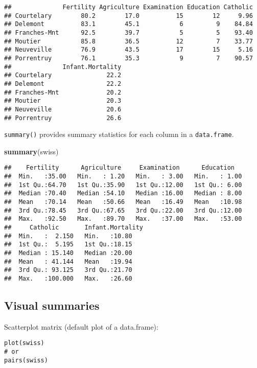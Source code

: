\documentclass[]{book}
\newenvironment{Shaded}{\begin{snugshade}}{\end{snugshade}}
\newcommand{\KeywordTok}[1]{\textcolor[rgb]{0.13,0.29,0.53}{\textbf{{#1}}}}
\newcommand{\NormalTok}[1]{{#1}}
\begin{document}
\begin{verbatim}
##              Fertility Agriculture Examination Education Catholic
## Courtelary        80.2        17.0          15        12     9.96
## Delemont          83.1        45.1           6         9    84.84
## Franches-Mnt      92.5        39.7           5         5    93.40
## Moutier           85.8        36.5          12         7    33.77
## Neuveville        76.9        43.5          17        15     5.16
## Porrentruy        76.1        35.3           9         7    90.57
##              Infant.Mortality
## Courtelary               22.2
## Delemont                 22.2
## Franches-Mnt             20.2
## Moutier                  20.3
## Neuveville               20.6
## Porrentruy               26.6
\end{verbatim}

\texttt{summary()} provides summary statistics for each column in a
\texttt{data.frame}.

\begin{Shaded}
\begin{Highlighting}[]
\KeywordTok{summary}\NormalTok{(swiss)}
\end{Highlighting}
\end{Shaded}

\begin{verbatim}
##    Fertility      Agriculture     Examination      Education    
##  Min.   :35.00   Min.   : 1.20   Min.   : 3.00   Min.   : 1.00  
##  1st Qu.:64.70   1st Qu.:35.90   1st Qu.:12.00   1st Qu.: 6.00  
##  Median :70.40   Median :54.10   Median :16.00   Median : 8.00  
##  Mean   :70.14   Mean   :50.66   Mean   :16.49   Mean   :10.98  
##  3rd Qu.:78.45   3rd Qu.:67.65   3rd Qu.:22.00   3rd Qu.:12.00  
##  Max.   :92.50   Max.   :89.70   Max.   :37.00   Max.   :53.00  
##     Catholic       Infant.Mortality
##  Min.   :  2.150   Min.   :10.80   
##  1st Qu.:  5.195   1st Qu.:18.15   
##  Median : 15.140   Median :20.00   
##  Mean   : 41.144   Mean   :19.94   
##  3rd Qu.: 93.125   3rd Qu.:21.70   
##  Max.   :100.000   Max.   :26.60
\end{verbatim}

\subsection{Visual summaries}\label{visual-summaries}

Scatterplot matrix (default plot of a data.frame):

\begin{verbatim}
plot(swiss)
# or
pairs(swiss)
\end{verbatim}
\end{document}
